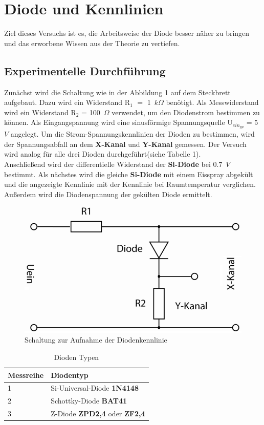 \section{Diode und Kennlinien}
Ziel dieses Versuchs ist es, die Arbeitsweise der Diode besser n\"aher zu bringen und das erworbene Wissen aus der Theorie zu vertiefen. 
\subsection{Experimentelle Durchf\"uhrung}
Zun\"achst wird die Schaltung wie in der Abbildung 1 auf dem Steckbrett aufgebaut. Dazu wird ein Widerstand R$_1$ $=$ 1~$k\Omega$ ben\"otigt. Als Messwiderstand wird ein Widerstand R$_2$ = 100~$\Omega$ verwendet, um den Diodenstrom bestimmen zu k\"onnen. Als Eingangspannung wird eine sinusf\"ormige Spannungsquelle U$_{ein_{pp}}$ = 5~$V$ angelegt. Um die Strom-Spannungskennlinien der Dioden zu bestimmen, wird der Spannungsabfall an dem \textbf{X-Kanal} und \textbf{Y-Kanal} gemessen. Der Versuch wird analog f\"ur alle drei Dioden durchgeführt(siehe Tabelle 1). \\
Anschlie\ss end wird der differentielle Widerstand der \textbf{Si-Diode} bei 0.7~$V$ bestimmt. Als n\"achstes wird die gleiche \textbf{Si-Diode} mit einem Eisspray abgek\"ult und die angezeigte Kennlinie mit der Kennlinie bei Raumtemperatur verglichen. Au\ss erdem wird die Diodenspannung der gek\"ulten Diode ermittelt. 
\begin{figure}[ht]
\begin{center}
\includegraphics[scale=0.4]{schaltungVersuch1}
\caption{Schaltung zur Aufnahme der Diodenkennlinie}
\end{center}
\end{figure}

\begin{table}[ht]
\begin{center}

\caption{Dioden Typen}
\begin{tabular}{|l|l|}
\hline
Messreihe & Diodentyp \\
\hline
1 & Si-Universal-Diode \textbf{1N4148} \\
\hline
2 & Schottky-Diode \textbf{BAT41} \\
\hline
3 & Z-Diode \textbf{ZPD2,4} oder \textbf{ZF2,4} \\
\hline
\end{tabular}
\end{center}

\end{table}

